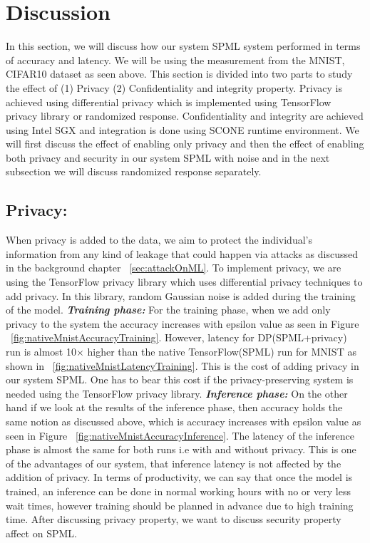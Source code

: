 \section{Discussion}
\label{sec:evalDiscussion}
In this section, we will discuss how our system SPML system performed in terms of accuracy and latency. We will be using the measurement from the MNIST, CIFAR10 dataset as seen above. This section is divided into two parts to study the effect of (1) Privacy (2) Confidentiality and integrity property. Privacy is achieved using differential privacy which is implemented using TensorFlow privacy library \cite{11} or randomized response. Confidentiality and integrity are achieved using Intel SGX and integration is done using SCONE runtime environment. We will first discuss the effect of enabling only privacy and then the effect of enabling both privacy and security in our system SPML with noise and in the next subsection we will discuss randomized response separately.

\subsection{Privacy:} 
When privacy is added to the data, we aim to protect the individual's information from any kind of leakage that could happen via attacks as discussed in the background chapter ~\ref{sec:attackOnML}. To implement privacy, we are using the TensorFlow privacy library which uses differential privacy techniques to add privacy. In this library, random Gaussian noise is added during the training of the model.
\newline
\newline
\textbf{\textit{Training phase: }}For the training phase, when we add only privacy to the system the accuracy increases with epsilon value as seen in Figure ~\ref{fig:nativeMnistAccuracyTraining}. However, latency for DP(SPML+privacy) run is almost 10$\times$ higher than the native TensorFlow(SPML) run for MNIST as shown in ~\ref{fig:nativeMnistLatencyTraining}. This is the cost of adding privacy in our system SPML. One has to bear this cost if the privacy-preserving system is needed using the TensorFlow privacy library.
\newline
\newline
\textbf{\textit{Inference phase: }}On the other hand if we look at the results of the inference phase, then accuracy holds the same notion as discussed above, which is accuracy increases with epsilon value as seen in Figure ~\ref{fig:nativeMnistAccuracyInference}. The latency of the inference phase is almost the same for both runs i.e with and without privacy. This is one of the advantages of our system, that inference latency is not affected by the addition of privacy. In terms of productivity, we can say that once the model is trained, an inference can be done in normal working hours with no or very less wait times, however training should be planned in advance due to high training time. After discussing privacy property, we want to discuss security property affect on SPML.

